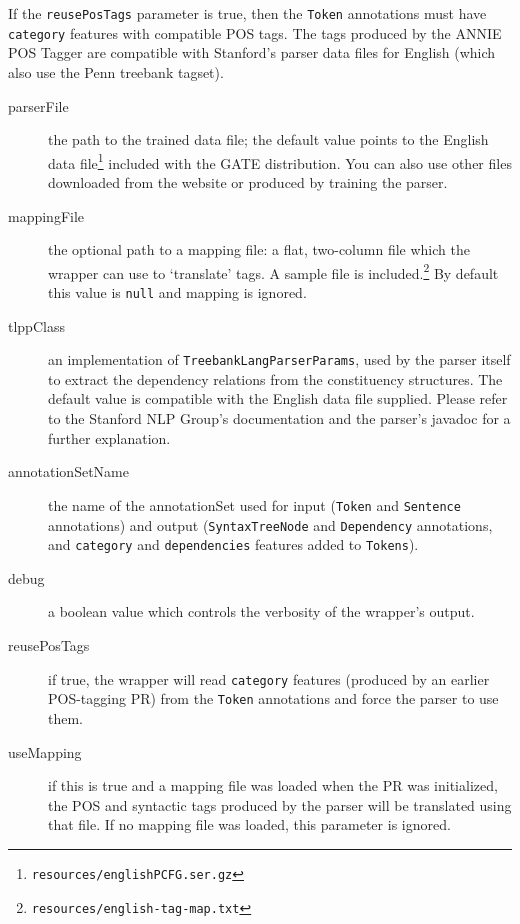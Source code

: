 If the \texttt{reusePosTags} parameter is true, then the
\texttt{Token} annotations must have \texttt{category} features with
compatible POS tags.  The tags produced by the ANNIE POS Tagger are
compatible with Stanford's parser data files for English (which also
use the Penn treebank tagset).
%
\begin{description}
%
\item[parserFile] the path to the trained data file; the default value
  points to the English data
  file\footnote{\texttt{resources/englishPCFG.ser.gz}} included with
  the GATE distribution.  You can also use other files downloaded from
  the
   website or produced by training the parser.
%
\item[mappingFile] the optional path to a mapping file: a flat,
  two-column file which the wrapper can use to `translate' tags.  A
  sample file is
  included.\footnote{\texttt{resources/english-tag-map.txt}} By
  default this value is \texttt{null} and mapping is ignored.
%
\item[tlppClass] an implementation of
  \texttt{TreebankLangParserParams}, used by the parser itself to
  extract the dependency relations from the constituency structures.
  The default value is compatible with the English data file supplied.
  Please refer to the Stanford NLP Group's documentation and the
  parser's javadoc for a further explanation.
%
\end{description}
%
\begin{description}
\item[annotationSetName] the name of the annotationSet used for input (\texttt{Token} and
  \texttt{Sentence} annotations) and output (\texttt{SyntaxTreeNode}
  and \texttt{Dependency} annotations, and \texttt{category} and
  \texttt{dependencies} features added to \texttt{Tokens}).
\item[debug] a boolean value which controls the verbosity of the
  wrapper's output.
\item[reusePosTags] if true, the wrapper will read \texttt{category}
  features (produced by an earlier POS-tagging PR) from the
  \texttt{Token} annotations and force the parser to use them.
\item[useMapping] if this is true and a mapping file was loaded when
  the PR was initialized, the POS and syntactic tags produced by the
  parser will be translated using that file.  If no mapping file was
  loaded, this parameter is ignored.
\end{description}


